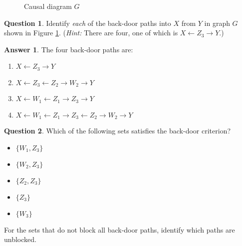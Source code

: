 \documentclass[11pt]{amsart}
\theoremstyle{definition}
\newtheorem{answer}{Answer}
\theoremstyle{question}
\newtheorem{question}{Question}
\begin{document}
\begin{figure}[h]
	\caption{Causal diagram $G$} \label{fig:causal}
    \centering
    

\end{figure}

\begin{question}
Identify \emph{each} of the back-door paths into $X$ from $Y$ in graph $G$ shown in Figure \ref{fig:causal}. (\emph{Hint:} There are four, one of which is $X \leftarrow Z_3 \rightarrow Y$.)
\end{question}

\begin{answer}
The four back-door paths are:
\begin{enumerate}
\item $X \leftarrow Z_3 \rightarrow Y$ 
\item $X \leftarrow Z_3 \leftarrow Z_2 \rightarrow W_2 \rightarrow Y$
\item $X \leftarrow W_1 \leftarrow Z_1 \rightarrow Z_3 \rightarrow Y$ 
\item $X \leftarrow W_1 \leftarrow Z_1 \rightarrow Z_3 \leftarrow Z_2 \rightarrow W_2 \rightarrow Y$ 	
\end{enumerate}
	
\end{answer}

\begin{question}
Which of the following sets satisfies the back-door criterion?
	\begin{itemize}
		\item $\{ W_1, Z_3 \}$
		\item $\{ W_2, Z_3 \}$
		\item $\{ Z_2, Z_3 \}$
		\item $\{ Z_3 \}$
		\item $\{ W_3 \}$
	\end{itemize}
For the sets that do not block all back-door paths, identify which paths are unblocked.
\end{question}
\end{document}

